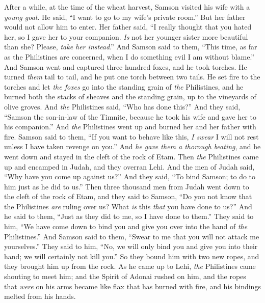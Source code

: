 \begin{biblechapter} %
 After a while, at the time of the wheat harvest, Samson visited his wife with a \textit{young goat}. He said, “I want to go to my wife’s private room.” But her father would not allow him to enter.
\verse Her father said, “I really thought that you hated her, so I gave her to your companion. \textit{Is} not her younger sister more beautiful than she? Please, \textit{take her instead}.”
\verse And Samson said to them, “This time, as far as the Philistines are concerned, when I do something evil I am without blame.”
\verse And Samson went and captured three hundred foxes, and he took torches. He turned \textit{them} tail to tail, and he put one torch between two tails.
\verse He set fire to the torches and let \textit{the foxes} go into the standing grain of \textit{the} Philistines, and he burned both the stacks of sheaves and the standing grain, up to the vineyards of olive groves.
\verse And \textit{the} Philistines said, “Who has done this?” And they said, “Samson the son-in-law of the Timnite, because he took his wife and gave her to his companion.” And \textit{the} Philistines went up and burned her and her father with fire.
\verse Samson said to them, “If you want to behave like this, \textit{I swear} I will not rest unless I have taken revenge on you.”
\verse And \textit{he gave them a thorough beating}, and he went down and stayed in the cleft of the rock of Etam.
\verse Then \textit{the} Philistines came up and encamped in Judah, and they overran Lehi.
\verse And the men of Judah said, “Why have you come up against us?” And they said, “To bind Samson; to do to him just as he did to us.”
\verse Then three thousand men from Judah went down to the cleft of the rock of Etam, and they said to Samson, “Do you not know that the Philistines \textit{are} ruling over us? What \textit{is} this \textit{that} you have done to us?” And he said to them, “Just as they did to me, so I have done to them.”
\verse They said to him, “We have come down to bind you and give you over into the hand of \textit{the} Philistines.” And Samson said to them, “Swear to me that you will not attack me yourselves.”
\verse They said to him, “No, we will only bind you and give you into their hand; we will certainly not kill you.” So they bound him with two new ropes, and they brought him up from the rock.
\verse As he came up to Lehi, \textit{the} Philistines came shouting to meet him; and the Spirit of Adonai rushed on him, and the ropes that \textit{were} on his arms became like flax that has burned with fire, and his bindings melted from his hands.

\end{biblechapter}

